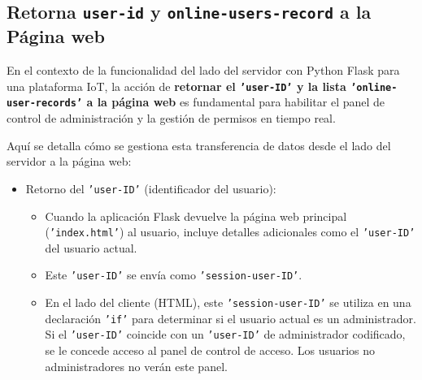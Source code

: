 \documentclass{report}
\begin{document}
\subsection{Retorna \texttt{user-id} y \texttt{online-users-record} a la Página web}
En el contexto de la funcionalidad del lado del servidor con Python Flask para una plataforma IoT, la acción de \textbf{retornar el \texttt{'user-ID'} 
y la lista \texttt{'online-user-records'} a la página web} es fundamental para habilitar el panel de control de administración y la gestión de permisos 
en tiempo real.

Aquí se detalla cómo se gestiona esta transferencia de datos desde el lado del servidor a la página web:
\begin{itemize}
    \item Retorno del \texttt{'user-ID'} (identificador del usuario):
        \begin{itemize}
            \item Cuando la aplicación Flask devuelve la página web principal (\texttt{'index.html'}) al usuario, incluye detalles adicionales como el 
            \texttt{'user-ID'} del usuario actual.
            \item Este \texttt{'user-ID'} se envía como \texttt{'session-user-ID'}.
            \item En el lado del cliente (HTML), este \texttt{'session-user-ID'} se utiliza en una declaración \texttt{'if'} para determinar si el usuario 
            actual es un administrador. Si el \texttt{'user-ID'} coincide con un \texttt{'user-ID'} de administrador codificado, se le concede acceso al 
            panel de control de acceso. Los usuarios no administradores no verán este panel.
        \end{itemize}


\end{itemize}
\end{document}
